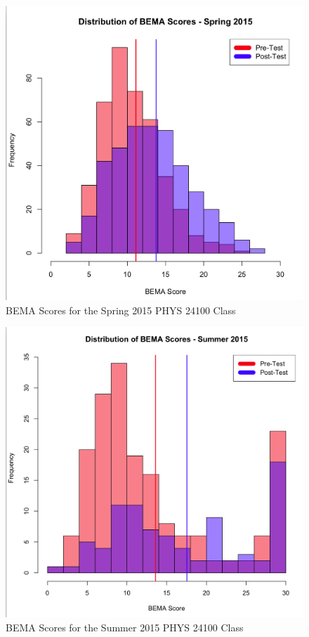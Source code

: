\begin{figure}[!htb]
	\centering
	\includegraphics[width=6in]{img/chapter4/bema_spring_2015}
	\caption[BEMA Scores for the Spring 2015 PHYS 24100 Class]{BEMA Scores for the Spring 2015 PHYS 24100 Class}
  \label{fig:bemaSp15}
\end{figure}

\begin{figure}[!htb]
	\centering
	\includegraphics[width=6in]{img/chapter4/bema_summer_2015}
	\caption[BEMA Scores for the Summer 2015 PHYS 24100 Class]{BEMA Scores for the Summer 2015 PHYS 24100 Class}
  \label{fig:bemaSu15}
\end{figure}

